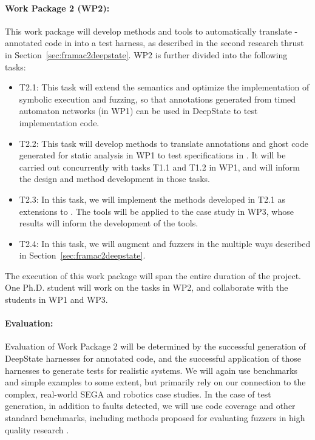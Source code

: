 \paragraph{Work Package 2 (WP2):}  This work package will develop methods and tools to automatically translate \acsl-annotated code in \framac into a \deepstate test harness, as described in the second research thrust in Section~\ref{sec:framac2deepstate}.
WP2 is further divided into the following tasks:
\begin{itemize}[labelsep=3pt,leftmargin=12pt]
\item T2.1: This task will extend the \eacsl semantics and optimize the implementation of symbolic execution and fuzzing, so that \acsl annotations generated from timed automaton networks (in WP1) can be used in DeepState to test implementation code.
\item T2.2: This task will develop methods to translate annotations and ghost code generated for static analysis in WP1 to test specifications in \deepstate.  It will be carried out concurrently with tasks T1.1 and T1.2 in WP1, and will inform the design and method development in those tasks.
\item T2.3: In this task, we will implement the methods developed in
  T2.1 as extensions to \deepstate.  The tools will be applied to the
  case study in WP3, whose results will inform the development of the
  tools.
\item T2.4: In this task, we will augment \deepstate and fuzzers in the multiple ways described in Section~\ref{sec:framac2deepstate}.  
\end{itemize}

The execution of this work package will span the entire duration of the project.
One Ph.D. student will work on the tasks in WP2, and collaborate with
the students in WP1 and WP3.

\paragraph{Evaluation:} Evaluation of
Work Package 2 will be determined by the successful generation of
DeepState harnesses for \acsl annotated code, and the successful
application of those harnesses to generate tests for realistic
systems.  We will again use benchmarks and simple examples to some
extent, but primarily rely on our connection to the %
complex, real-world SEGA and robotics case studies.
In the case of test generation, in addition to faults
detected, we will use code coverage and other standard benchmarks,
including methods proposed for evaluating fuzzers in high quality
research \cite{FuzzerHicks}.


